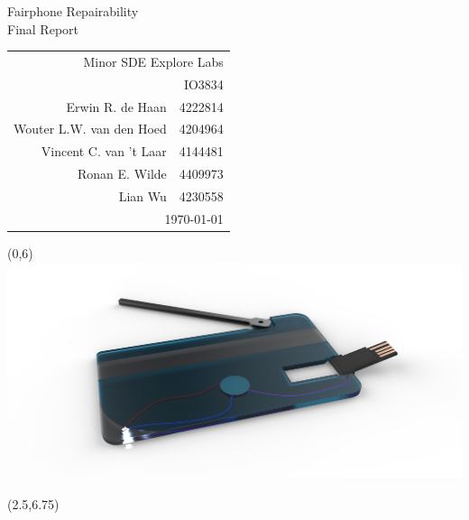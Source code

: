 \documentclass[final,a4paper]{report} %
\begin{document}
\begin{titlepage}

 \BgThispage

\newlength{\drop}

\begingroup
	\sffamily

	\textheight
	\vspace*{\drop}
	\begin{flushright}
		{\fontsize{1.5cm}{1em} \selectfont \color{white} Fairphone Repairability} \\
		\vspace*{54pt}
		{\fontsize{0.8cm}{1em} \selectfont Final Report}

		\vfill

		{\fontsize{0.5cm}{1em} \selectfont
			\normalfont
			
			\begin{tabular}{rr}
				\multicolumn{2}{r}{Minor SDE Explore Labs} \\[0.5em]
				\multicolumn{2}{r}{IO3834} \\[1.5em]	
				Erwin R. {de Haan} & 4222814\\[0.5em]
				Wouter L.W. {van den Hoed} & 4204964 \\[0.5em]
				Vincent C. {van 't Laar} & 4144481 \\[0.5em]
				Ronan E. {Wilde} & 4409973 \\[0.5em]
				Lian {Wu} & 4230558 \\[1.5em]
				\multicolumn{2}{r}{\today} \\
			\end{tabular}
			
		}
	\end{flushright}
\endgroup

\begin{textblock}{16.1}(0,6)
	\includegraphics[width=\linewidth]{resources/screw-it-render.jpg}
\end{textblock}

\begin{textblock}{16.1}(2.5,6.75)
\end{textblock}

\end{titlepage}
\end{document}
